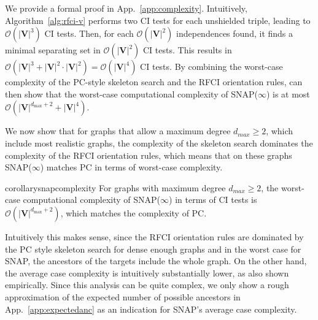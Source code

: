 We provide a formal proof in App.~\ref{app:complexity}.
Intuitively, Algorithm~\ref{alg:rfci-v} performs two \ac{CI} tests for each unshielded triple, leading to $\mathcal{O}(|\mathbf{V}|^3)$ \ac{CI} tests.
Then, for each $\mathcal{O}(|\mathbf{V}|^2)$ independences found, it finds a minimal separating set in $\mathcal{O}(|\mathbf{V}|^2)$ \ac{CI} tests.
This results in $\mathcal{O}(|\mathbf{V}|^3 + |\mathbf{V}|^2 \cdot |\mathbf{V}|^2) = \mathcal{O}(|\mathbf{V}|^4)$ \ac{CI} tests.
By combining the worst-case complexity of the PC-style skeleton search and the RFCI orientation rules, can then show that the worst-case computational complexity of SNAP($\infty$) is at most
$\mathcal{O}(|\mathbf{V}|^{d_{\max}+2} + |\mathbf{V}|^4)$. 

We now show that for graphs that allow a maximum degree $d_{max} \geq 2$, which include most realistic graphs, the complexity of the skeleton search dominates the complexity of the RFCI orientation rules, which means that on these graphs SNAP($\infty$) matches PC in terms of worst-case complexity.


\begin{restatable}[]{corollary}{snapcomplexity}
\label{col:snap_complexity}
For graphs with maximum degree $d_{max} \geq 2$, the worst-case computational complexity of SNAP($\infty$) in terms of \ac{CI} tests is $\mathcal{O}(|\mathbf{V}|^{d_{\max}+2})$, which matches the complexity of PC.
\end{restatable}

Intuitively this makes sense, since the RFCI orientation rules are dominated by the PC style skeleton search for dense enough graphs and in the worst case for SNAP, the ancestors of the targets include the whole graph. On the other hand, the average case complexity is intuitively substantially lower, as also shown empirically. Since this analysis can be quite complex, we only show a rough approximation of the expected number of possible ancestors in App.~\ref{app:expectedanc} as an indication for SNAP's average case complexity.
